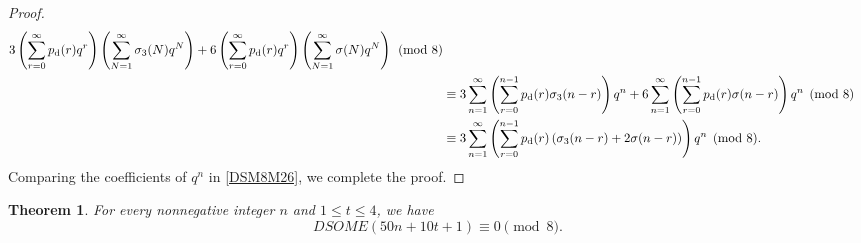 \documentclass[12pt]{article}
\numberwithin{equation}{section}
\newtheorem{theorem}{Theorem}[section]
\theoremstyle{definition}
\theoremstyle{remark}
\numberwithin{equation}{section}
\begin{document}
\begin{proof}
\begin{align}
3
\left(
\sum_{r=0}^{\infty}p_{\mathrm d}(r)q^r
\right)
\left(
\sum_{N=1}^{\infty}\sigma_3(N)q^N
\right)+
6
\left(
\sum_{r=0}^{\infty}p_{\mathrm d}(r)q^r
\right)
\left(
\sum_{N=1}^{\infty}\sigma(N)q^N
\right)
\pmod8
\notag\\
&\equiv
3\sum_{n=1}^{\infty}
\left(
\sum_{r=0}^{n-1}
p_{\mathrm d}(r)\sigma_3(n-r)
\right)q^n+
6\sum_{n=1}^{\infty}
\left(
\sum_{r=0}^{n-1}
p_{\mathrm d}(r)\sigma(n-r)
\right)q^n
\pmod8
\notag\\
&\label{DSM8M26}\equiv
3\sum_{n=1}^{\infty}
\left(
\sum_{r=0}^{n-1}
p_{\mathrm d}(r)
\left(
\sigma_3(n-r)+2\sigma(n-r)
\right)
\right)q^n
\pmod8.
\end{align}
Comparing the coefficients of $q^n$ in \eqref{DSM8M26}, we complete the proof.
\end{proof}

\begin{theorem}\label{nd1}
For every nonnegative integer $n$ and $1\leq t \leq 4$, we have
$$DSOME(50n+10t+1)\equiv 0\pmod{8}.$$
\end{theorem}
\end{document}

